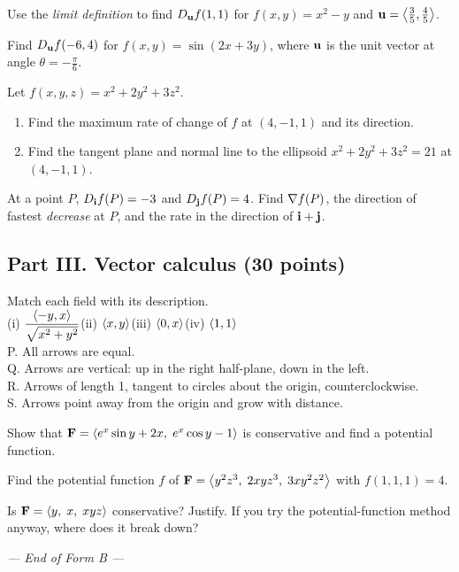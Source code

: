 \begin{questions}[resume]
\item Use the \emph{limit definition} to find $D_{\mathbf{u}} f(1,1)$ for $f(x,y)=x^2-y$ and
      $\mathbf{u}=\left\langle \frac35,\frac45 \right\rangle$. 
\item Find $D_{\mathbf{u}} f(-6,4)$ for $f(x,y)=\sin(2x+3y)$, where $\mathbf{u}$ is the unit vector
      at angle $\theta=-\frac\pi6$. 
\item Let $f(x,y,z)=x^2+2y^2+3z^2$.
      \begin{enumerate}[label=(\alph*)]
        \item Find the maximum rate of change of $f$ at $(4,-1,1)$ and its direction.
        \item Find the tangent plane and normal line to the ellipsoid
              $x^2+2y^2+3z^2=21$ at $(4,-1,1)$.
      \end{enumerate}
\item At a point $P$, $D_{\mathbf{i}}f(P)=-3$ and $D_{\mathbf{j}}f(P)=4$. Find $\nabla f(P)$, the
      direction of fastest \emph{decrease} at $P$, and the rate in the
      direction of $\mathbf{i}+\mathbf{j}$. 
\end{questions}

\subsection*{Part III. Vector calculus (30 points)}

\begin{questions}[resume]
\item Match each field with its description.\\
      (i) $\dfrac{\left\langle -y,x \right\rangle}{\sqrt{x^2+y^2}}$\quad (ii) $\left\langle x,y \right\rangle$\quad (iii) $\left\langle 0,x \right\rangle$\quad (iv) $\left\langle 1,1 \right\rangle$\\[2pt]
      P. All arrows are equal.\\
      Q. Arrows are vertical: up in the right half-plane, down in the left.\\
      R. Arrows of length 1, tangent to circles about the origin, counterclockwise.\\
      S. Arrows point away from the origin and grow with distance. 
\item Show that $\mathbf{F}=\left\langle e^x\sin y+2x,\;e^x\cos y-1 \right\rangle$ is conservative and find a
      potential function. 
\item Find the potential function $f$ of
      $\mathbf{F}=\left\langle y^2z^3,\;2xyz^3,\;3xy^2z^2 \right\rangle$ with $f(1,1,1)=4$. 
\item Is $\mathbf{F}=\left\langle y,\;x,\;xyz \right\rangle$ conservative? Justify. If you try the
      potential-function method anyway, where does it break down? 
\end{questions}

\begin{center}\textit{--- End of Form B ---}\end{center}
